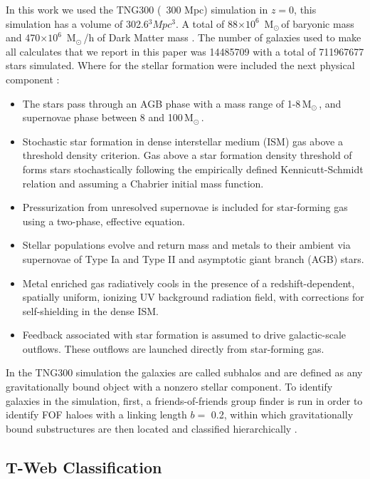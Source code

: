 \documentclass[usenatbib]{mnras}
\newcommand{\Msun}{\,{\rm M}$_{\odot}$\,}
\begin{document}
In this work we used the TNG300 (~300 Mpc) simulation in $z=0$, this simulation has a volume of 302.6$^3 Mpc^3$. 
A total of 88$\times 10^{6}$ \Msun of baryonic mass
and 470$\times 10^{6}$ \Msun/h of Dark Matter mass \cite{Nelson2015}. 
The number of galaxies used to make all calculates that we report in this paper
was 14485709 with a total of 711967677 stars simulated. Where for the stellar formation were included the next physical component \cite{Nelson2015,Pillepich2018a}:
\begin{itemize}
    \item The stars pass through an AGB phase with a mass range of 1-8\Msun, and supernovae phase between 8 and 100\Msun. 
    \item Stochastic star formation in dense interstellar medium (ISM) gas above a threshold density criterion. Gas above a star formation density threshold of forms stars stochastically following the empirically defined Kennicutt-Schmidt relation and assuming a Chabrier initial mass function.
    \item Pressurization from unresolved supernovae is included for star-forming gas using a two-phase, effective equation.
    \item Stellar populations evolve and return mass and metals to their ambient via supernovae of Type Ia and Type II and asymptotic giant branch (AGB) stars.
    \item Metal enriched gas radiatively cools in the presence of a redshift-dependent, spatially uniform, ionizing UV background radiation field, with corrections for self-shielding in the dense ISM.
    \item Feedback associated with star formation is assumed to drive galactic-scale outflows. These outflows are launched directly from star-forming gas.
\end{itemize}


In the TNG300 simulation the galaxies are called subhalos and
are defined as any gravitationally 
bound object with a nonzero
stellar component. 
To identify galaxies in the simulation,
first, a friends-of-friends group finder is run
in order to identify FOF haloes with
a linking length $b=$ 0.2,
within which gravitationally bound substructures
are then located and classified hierarchically \cite{Pillepich2018a}.
 

\subsection{T-Web Classification}
\end{document}

